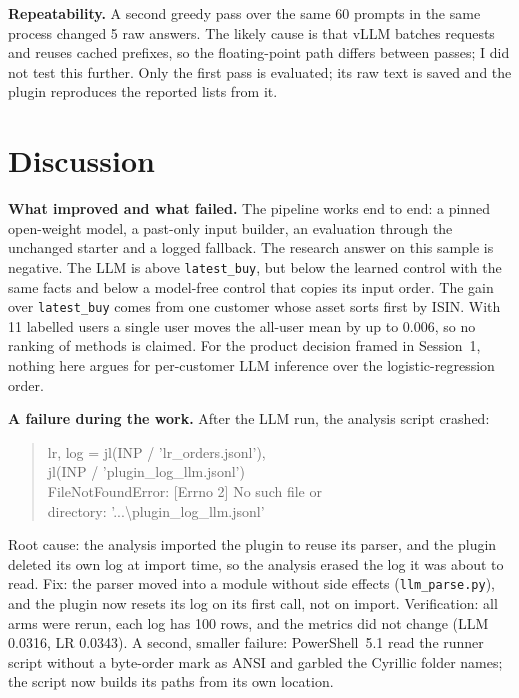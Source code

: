 \documentclass[conference]{IEEEtran}
\begin{document}
\textbf{Repeatability.} A second greedy pass over the same 60 prompts in the same process changed 5 raw answers. The likely cause is that vLLM batches requests and reuses cached prefixes, so the floating-point path differs between passes; I did not test this further. Only the first pass is evaluated; its raw text is saved and the plugin reproduces the reported lists from it.

\section{Discussion}

\textbf{What improved and what failed.} The pipeline works end to end: a pinned open-weight model, a past-only input builder, an evaluation through the unchanged starter and a logged fallback. The research answer on this sample is negative. The LLM is above \texttt{latest\_buy}, but below the learned control with the same facts and below a model-free control that copies its input order. The gain over \texttt{latest\_buy} comes from one customer whose asset sorts first by ISIN. With 11 labelled users a single user moves the all-user mean by up to 0.006, so no ranking of methods is claimed. For the product decision framed in Session~1, nothing here argues for per-customer LLM inference over the logistic-regression order.

\textbf{A failure during the work.} After the LLM run, the analysis script crashed:
\begin{quote}\footnotesize\ttfamily
lr, log = jl(INP / 'lr\_orders.jsonl'),\\
\hspace*{1em}jl(INP / 'plugin\_log\_llm.jsonl')\\
FileNotFoundError: [Errno 2] No such file or\\
\hspace*{1em}directory: '...\textbackslash plugin\_log\_llm.jsonl'
\end{quote}
Root cause: the analysis imported the plugin to reuse its parser, and the plugin deleted its own log at import time, so the analysis erased the log it was about to read. Fix: the parser moved into a module without side effects (\texttt{llm\_parse.py}), and the plugin now resets its log on its first call, not on import. Verification: all arms were rerun, each log has 100 rows, and the metrics did not change (LLM 0.0316, LR 0.0343). A second, smaller failure: PowerShell~5.1 read the runner script without a byte-order mark as ANSI and garbled the Cyrillic folder names; the script now builds its paths from its own location.
\end{document}
